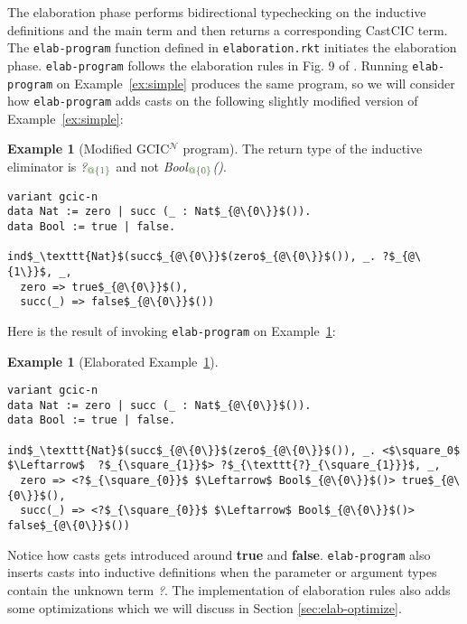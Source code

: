 \documentclass{article}
\theoremstyle{definition}
\newtheorem{example}[theorem]{Example}
\newcommand{\Gcode}[1]{{\color{OliveGreen}\textit{#1}}}
\newcommand{\Ccode}[1]{{\color{BlueViolet}\textbf{#1}}}
\newcommand{\Gcmath}[1]{{\color{OliveGreen}#1}}
\newcommand{\Gcsub}[2]{\Gcode{#1}\(\Gcmath{_{#2}}\)}
\newcommand{\GCICN}[0]{GCIC\(^\mathcal{N}\)}
\begin{document}
The elaboration phase performs bidirectional typechecking on the inductive
definitions and the main term and then returns a corresponding CastCIC term. The
\texttt{elab-program} function defined in \texttt{elaboration.rkt} initiates the
elaboration phase. \texttt{elab-program} follows the elaboration rules in Fig. 9
of \citet{lennon-bertrand_gradualizing_2022}. Running \texttt{elab-program} on
Example~\ref{ex:simple} produces the same program, so we will consider how
\texttt{elab-program} adds casts on the following slightly modified version of
Example~\ref{ex:simple}:
\begin{example}[Modified \GCICN{} program]
\label{ex:simple-unk}
The return type of the inductive eliminator is \Gcsub{?}{@\{1\}} and not
\Gcsub{Bool}{@\{0\}}\Gcode{()}.
\begin{lstlisting}[mathescape,language=GCIC]
variant gcic-n
data Nat := zero | succ (_ : Nat$_{@\{0\}}$()).
data Bool := true | false.

ind$_\texttt{Nat}$(succ$_{@\{0\}}$(zero$_{@\{0\}}$()), _. ?$_{@\{1\}}$, _,
  zero => true$_{@\{0\}}$(),
  succ(_) => false$_{@\{0\}}$())
\end{lstlisting}
\end{example}
\noindent Here is the result of invoking \texttt{elab-program} on
Example~\ref{ex:simple-unk}:
\begin{example}[Elaborated Example~\ref{ex:simple-unk}]
\label{ex:simple-unk-cast}\
\begin{lstlisting}[mathescape,language=CCIC]
variant gcic-n
data Nat := zero | succ (_ : Nat$_{@\{0\}}$()).
data Bool := true | false.

ind$_\texttt{Nat}$(succ$_{@\{0\}}$(zero$_{@\{0\}}$()), _. <$\square_0$ $\Leftarrow$  ?$_{\square_{1}}$> ?$_{\texttt{?}_{\square_{1}}}$, _,
  zero => <?$_{\square_{0}}$ $\Leftarrow$ Bool$_{@\{0\}}$()> true$_{@\{0\}}$(),
  succ(_) => <?$_{\square_{0}}$ $\Leftarrow$ Bool$_{@\{0\}}$()> false$_{@\{0\}}$())
\end{lstlisting}
\end{example}

\noindent Notice how casts gets introduced around \Ccode{true} and
\Ccode{false}. \texttt{elab-program} also inserts casts into inductive
definitions when the parameter or argument types contain the unknown term
\Gcode{?}. The implementation of elaboration rules also adds some optimizations
which we will discuss in Section \ref{sec:elab-optimize}.
\end{document}
